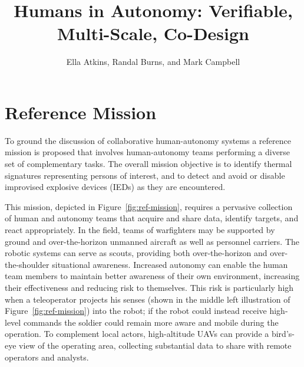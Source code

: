 \documentclass[11pt]{dssg}
\begin{document}
\title{Humans in Autonomy: Verifiable, Multi-Scale, Co-Design}

\author{Ella Atkins, Randal Burns, and Mark Campbell}

\maketitle














%
\section*{Reference Mission}

To ground the discussion of collaborative human-autonomy systems a reference mission is proposed
that involves human-autonomy teams performing a diverse set of complementary tasks.  The overall
mission objective is to identify thermal signatures representing persons of interest, and to detect and avoid
or disable improvised explosive devices (IEDs) as they are encountered.

This mission, depicted in Figure~\ref{fig:ref-mission}, requires a pervasive collection of human and autonomy teams that
acquire and share data, identify targets, and react appropriately.  In the field, teams of warfighters may be supported by ground and over-the-horizon unmanned aircraft as well as personnel carriers.  The robotic systems can serve as scouts, providing both over-the-horizon and over-the-shoulder situational awareness.  Increased autonomy can enable the human team members to maintain better awareness of their own environment, increasing their effectiveness and reducing risk to themselves.  This risk is particularly high when a teleoperator projects his senses (shown in the middle left illustration of Figure~\ref{fig:ref-mission}) into the robot; if the robot could instead receive high-level commands the soldier could remain more aware and mobile during the operation.  To complement local actors, high-altitude UAVs can provide a bird's-eye view of the operating area, collecting substantial data to share with remote operators and analysts.
\end{document}
